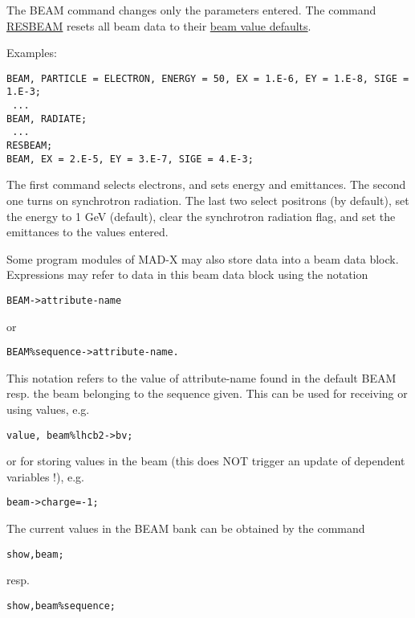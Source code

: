 The BEAM command changes only the parameters entered. The command
\href{resbeam.html}{RESBEAM} resets all beam data to their
\href{resbeam.html#defaults}{beam value defaults}.  

Examples: 
\begin{verbatim}
BEAM, PARTICLE = ELECTRON, ENERGY = 50, EX = 1.E-6, EY = 1.E-8, SIGE = 1.E-3;
 ...
BEAM, RADIATE;
 ...
RESBEAM;
BEAM, EX = 2.E-5, EY = 3.E-7, SIGE = 4.E-3;
\end{verbatim} 

The first command selects electrons, and sets energy and emittances. The
second one turns on synchrotron radiation. The last two select positrons
(by default), set the energy to 1 GeV (default), clear the synchrotron
radiation flag, and set the emittances to the values entered.  

Some program modules of MAD-X may also store data into a beam data
block. Expressions may refer to data in this beam data block using the
notation  
\begin{verbatim}
BEAM->attribute-name
\end{verbatim} 
or 
\begin{verbatim}
BEAM%sequence->attribute-name.
\end{verbatim} 

This notation refers to the value of attribute-name found in the default
BEAM resp. the beam belonging to the sequence given. This can be used
for receiving or using values, e.g. 

\begin{verbatim}
value, beam%lhcb2->bv;
\end{verbatim} 
or for storing values in the beam (this does NOT trigger an update of dependent variables !), e.g. 
\begin{verbatim}
beam->charge=-1;
\end{verbatim} 

The current values in the BEAM bank can be obtained by the command
\begin{verbatim}
show,beam;
\end{verbatim}
resp.
\begin{verbatim}
show,beam%sequence;
\end{verbatim}


